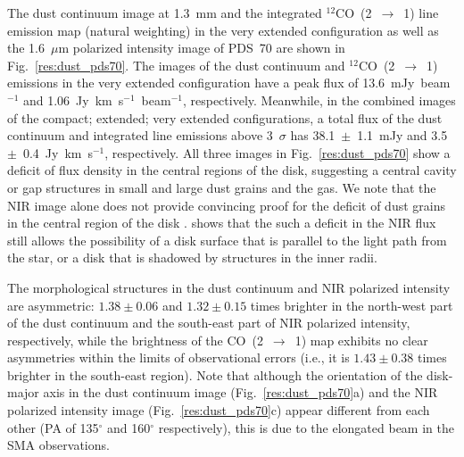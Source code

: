 \documentclass[apj]{emulateapj-rtx4}
\begin{document}
  The dust continuum image at 1.3~mm and the integrated $^{12}$CO~(2~$\rightarrow$~1) line emission map (natural weighting) 
  in the very extended configuration as well as the 1.6~$\mu$m polarized intensity image of PDS~70 are shown in 
  Fig.~\ref{res:dust_pds70}. The images of the dust continuum and $^{12}$CO~(2~$\rightarrow$~1) emissions in the very extended 
  configuration have a peak flux of 13.6~mJy~beam$^{-1}$ and 1.06~Jy~km~s$^{-1}$~beam$^{-1}$, respectively. Meanwhile,
  in the combined images of the compact; extended; very extended configurations, a total flux of the dust continuum and integrated 
  line emissions above 3~$\sigma$ has 38.1~$\pm$~1.1~mJy and 3.5~$\pm$~0.4~Jy~km~s$^{-1}$, respectively. 
  All three images in Fig.~\ref{res:dust_pds70} show
  a deficit of flux density in the central regions of the disk, 
    suggesting a
  central cavity or gap structures in small and large dust grains and the gas. 
We note that the NIR image alone does not provide convincing proof for the deficit of dust grains in the central region of the disk \citep{taka14}. \citet{taka14} shows that the such a deficit in the NIR flux still allows the possibility of a disk surface that is parallel to the light path from the star, or a disk that is shadowed by structures in the inner radii.

  The morphological structures in the dust continuum and NIR polarized intensity are asymmetric:
    $1.38 \pm 0.06$ and $1.32 \pm 0.15$ times brighter in the north-west part of the dust continuum and the south-east part of 
    NIR polarized intensity, respectively, while the brightness of the CO~(2~$\rightarrow$~1) map exhibits no clear asymmetries
      within the limits of observational errors (i.e., it is
    $1.43 \pm 0.38$ times brighter in the south-east region).
  Note that although the orientation of the disk-major axis in the dust continuum image (Fig.~\ref{res:dust_pds70}a) and 
  the NIR polarized intensity image (Fig.~\ref{res:dust_pds70}c) appear different from each other (PA of 135$^{\circ}$ and 
  160$^{\circ}$ respectively), this is due to the elongated beam in the SMA observations.
\end{document}
